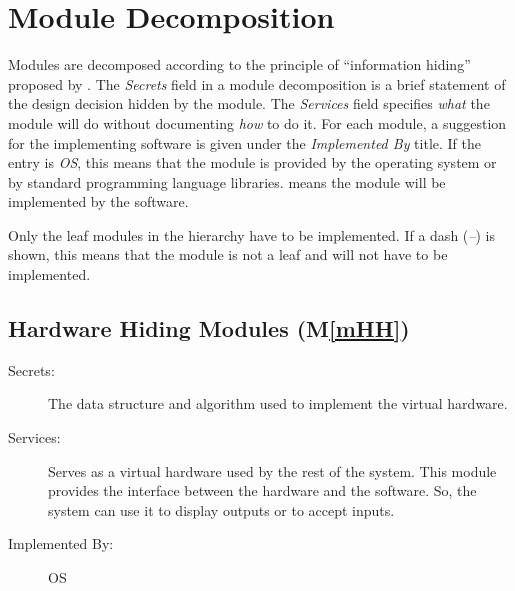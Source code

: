 \documentclass[12pt, titlepage]{article}
\newcommand{\mref}[1]{M\ref{#1}}
\begin{document}

\section{Module Decomposition} \label{SecMD}

Modules are decomposed according to the principle of ``information hiding'' proposed by
\citet{ParnasEtAl1984}. The \emph{Secrets} field in a module decomposition is a brief statement of
the design decision hidden by the module. The \emph{Services} field specifies \emph{what} the
module will do without documenting \emph{how} to do it. For each module, a suggestion for the
implementing software is given under the \emph{Implemented By} title. If the entry is \emph{OS},
this means that the module is provided by the operating system or by standard programming language
libraries. \emph{\progname{}} means the module will be implemented by the \progname{} software.

Only the leaf modules in the hierarchy have to be implemented. If a dash (\emph{--}) is shown, this
means that the module is not a leaf and will not have to be implemented.

\subsection{Hardware Hiding Modules (\mref{mHH})}

\begin{description}
	\item[Secrets:]The data structure and algorithm used to implement the virtual hardware.
	\item[Services:]Serves as a virtual hardware used by the rest of the system. This module provides the
	interface between the hardware and the software. So, the system can use it to display outputs or to
	accept inputs.
	\item[Implemented By:] OS
\end{description}
\end{document}
